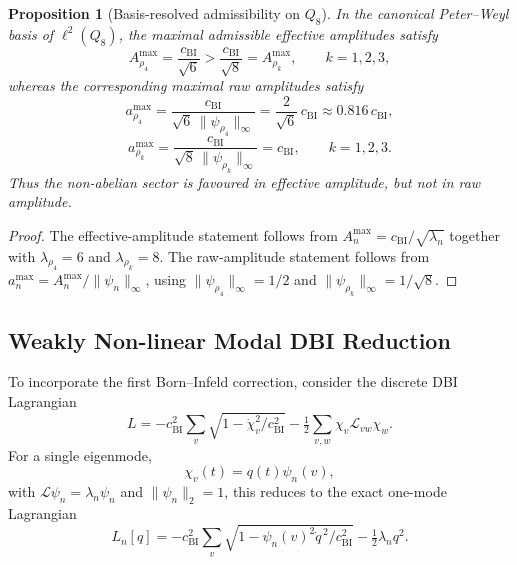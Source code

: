 \documentclass[11pt,a4paper]{article}
\newtheorem{proposition}{Proposition}
\begin{document}
  \begin{proposition}[Basis-resolved admissibility on $Q_8$]
    \label{prop:basis-resolved}
    In the canonical Peter--Weyl basis of $\ell^2(Q_8)$, the maximal admissible
    effective amplitudes satisfy
    \begin{equation}
      A_{\rho_4}^{\max}
      =
      \frac{c_{\mathrm{BI}}}{\sqrt{6}}
      >
      \frac{c_{\mathrm{BI}}}{\sqrt{8}}
      =
      A_{\rho_k}^{\max},
      \qquad
      k=1,2,3,
    \end{equation}
    whereas the corresponding maximal raw amplitudes satisfy
    \begin{equation}
      a_{\rho_4}^{\max}
      =
      \frac{c_{\mathrm{BI}}}{\sqrt{6}\,\|\psi_{\rho_4}\|_\infty}
      =
      \frac{2}{\sqrt{6}}\,c_{\mathrm{BI}}
      \approx 0.816\,c_{\mathrm{BI}},
    \end{equation}
    \begin{equation}
      a_{\rho_k}^{\max}
      =
      \frac{c_{\mathrm{BI}}}{\sqrt{8}\,\|\psi_{\rho_k}\|_\infty}
      =
      c_{\mathrm{BI}},
      \qquad
      k=1,2,3.
    \end{equation}
    Thus the non-abelian sector is favoured in effective amplitude, but not in raw
    amplitude.
  \end{proposition}

  \begin{proof}
    The effective-amplitude statement follows from
    $A_n^{\max} = c_{\mathrm{BI}}/\sqrt{\lambda_n}$ together with
    $\lambda_{\rho_4} = 6$ and $\lambda_{\rho_k} = 8$.
    The raw-amplitude statement follows from
    $a_n^{\max} = A_n^{\max}/\|\psi_n\|_\infty$, using
    $\|\psi_{\rho_4}\|_\infty = 1/2$ and
    $\|\psi_{\rho_k}\|_\infty = 1/\sqrt{8}$.
  \end{proof}
\subsection{Weakly Non-linear Modal DBI Reduction}
  \label{subsec:weakly-nonlinear-dbi-reduction}

  To incorporate the first Born--Infeld correction, consider the discrete DBI Lagrangian
  \begin{equation}
    \label{eq:dbi-lagrangian}
    L
    =
    -c_{\mathrm{BI}}^2 \sum_v \sqrt{1 - \dot{\chi}_v^2/c_{\mathrm{BI}}^2}
    - \tfrac{1}{2} \sum_{v,w} \chi_v \mathcal{L}_{vw} \chi_w.
  \end{equation}
  For a single eigenmode,
  \begin{equation}
    \chi_v(t) = q(t)\psi_n(v),
  \end{equation}
  with $\mathcal{L}\psi_n = \lambda_n \psi_n$ and $\|\psi_n\|_2 = 1$, this reduces to
  the exact one-mode Lagrangian
  \begin{equation}
    \label{eq:exact-mode-lagrangian}
    L_n[q]
    =
    -c_{\mathrm{BI}}^2 \sum_v \sqrt{1 - \psi_n(v)^2 \dot{q}^{\,2}/c_{\mathrm{BI}}^2}
    - \tfrac{1}{2}\lambda_n q^2.
  \end{equation}
\end{document}
